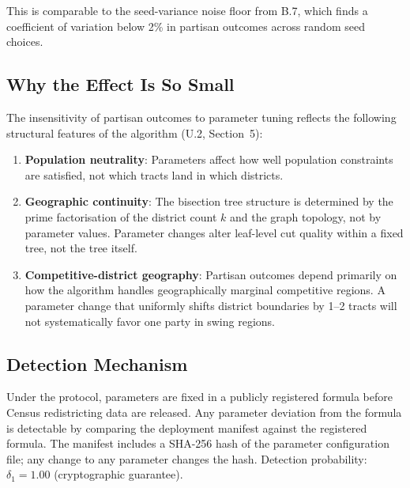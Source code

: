 This is comparable to the seed-variance noise floor from B.7, which
finds a coefficient of variation below 2\% in partisan outcomes across
random seed choices.

\subsection{Why the Effect Is So Small}

The insensitivity of partisan outcomes to parameter tuning reflects the
following structural features of the algorithm (U.2, Section~5):
\begin{enumerate}
\item \textbf{Population neutrality}: Parameters affect how well population
  constraints are satisfied, not which tracts land in which districts.
\item \textbf{Geographic continuity}: The bisection tree structure is
  determined by the prime factorisation of the district count $k$ and the
  graph topology, not by parameter values.
  Parameter changes alter leaf-level cut quality within a fixed tree,
  not the tree itself.
\item \textbf{Competitive-district geography}: Partisan outcomes depend
  primarily on how the algorithm handles geographically marginal competitive
  regions.
  A parameter change that uniformly shifts district boundaries by 1--2
  tracts will not systematically favor one party in swing regions.
\end{enumerate}

\subsection{Detection Mechanism}

Under the \dia{} protocol, parameters are fixed in a publicly registered
formula before Census redistricting data are released.
Any parameter deviation from the formula is detectable by comparing
the deployment manifest against the registered formula.
The manifest includes a SHA-256 hash of the parameter configuration file;
any change to any parameter changes the hash.
Detection probability: $\delta_1 = 1.00$ (cryptographic guarantee).
